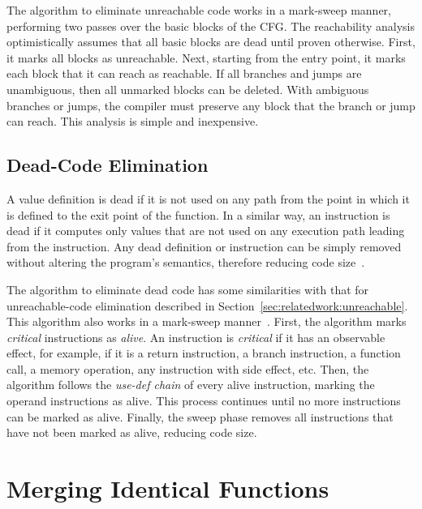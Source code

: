 The algorithm to eliminate unreachable code works in a mark-sweep manner, performing two passes over the basic blocks of the CFG.
The reachability analysis optimistically assumes that all basic blocks are dead until proven otherwise.
First, it marks all blocks as unreachable.
Next, starting from the entry point, it marks each block that it can reach as reachable.
If all branches and jumps are unambiguous, then all unmarked blocks can be deleted.
With ambiguous branches or jumps, the compiler must preserve any block that the branch or jump can reach.
This analysis is simple and inexpensive.

\subsection{Dead-Code Elimination}

A value definition is dead if it is not used on any path from the point in which it is defined to the exit point of the function.
In a similar way, an instruction is dead if it computes only values that are not used on any execution path leading from the instruction.
Any dead definition or instruction can be simply removed without altering the program's semantics, therefore reducing code size~\cite{muchnick98}.

The algorithm to eliminate dead code has some similarities with that for unreachable-code elimination described in Section~\ref{sec:relatedwork:unreachable}.
This algorithm also works in a mark-sweep manner~\cite{cooper07}.
First, the algorithm marks \textit{critical} instructions as \textit{alive}.
An instruction is \textit{critical} if it has an observable effect, for example, if it is a return instruction, a branch instruction, a function call, a memory operation, any instruction with side effect, etc.
Then, the algorithm follows the \textit{use-def chain} of every alive instruction, marking the operand instructions as alive.
This process continues until no more instructions can be marked as alive.
Finally, the sweep phase removes all instructions that have not been marked as alive, reducing code size.

\section{Merging Identical Functions}

